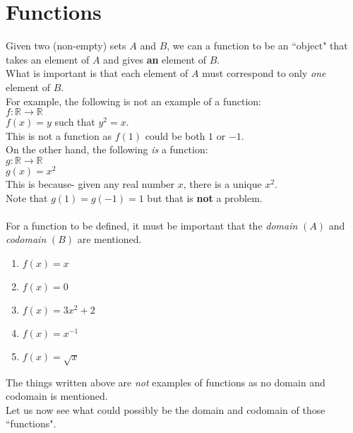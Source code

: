 \section{Functions}\label{sec:functions}
Given two (non-empty) sets $A$ and $B$, we can a function to be an ``object" that takes an element of $A$ and gives \textbf{an} element of $B$.\\
What is important is that each element of $A$ must correspond to only \textit{one} element of $B$. \\
For example, the following is not an example of a function:\\
$f:\mathbb{R}\to\mathbb{R}$\\
$f(x) = y$ such that $y^2 = x$.\\
This is not a function as $f(1)$ could be both $1$ or $-1$.\\
On the other hand, the following \textit{is} a function:\\
$g:\mathbb{R}\to\mathbb{R}$\\
$g(x) = x^2$\\
This is because- given any real number $x$, there is a unique $x^2.$\\
Note that $g(1)=g(-1)=1$ but that is \textbf{not} a problem.\\~\\
For a function to be defined, it must be important that the \textit{domain} $(A)$ and \textit{codomain} $(B)$ are mentioned.
\begin{enumerate}[nosep]
    \item $f(x) = x$
    \item $f(x) = 0$
    \item $f(x) = 3x^2+2$
    \item $f(x) = x^{-1}$
    \item $f(x) = \sqrt{x}$
\end{enumerate}
The things written above are \textit{not} examples of functions as no domain and codomain is mentioned.\\
Let us now see what could possibly be the domain and codomain of those ``functions".

